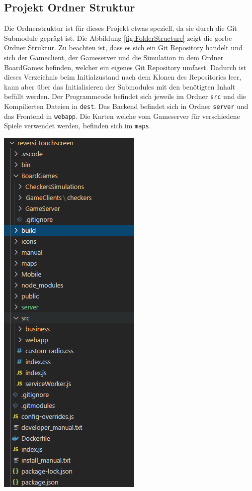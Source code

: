 \documentclass[12pt,a4paper,bibliography=totocnumbered,listof=totocnumbered]{article}
\begin{document}
\begin{appendix}
\section{Projekt Ordner Struktur}
Die Ordnerstruktur ist für dieses Projekt etwas speziell, da sie durch die Git Submodule geprägt ist.
Die Abbildung \ref{fig:FolderStructure} zeigt die gorbe Ordner Struktur. Zu beachten ist, dass es sich ein Git Repository handelt und sich
der Gameclient, der Gameserver und die Simulation in dem Ordner BoardGames befinden, welcher ein eigenes Git Repository umfasst. 
Dadurch ist dieses Verzeichnis beim Initialzustand nach dem Klonen des Repositories leer, kann aber über das Initialisieren der Submodules 
mit den benötigten Inhalt befüllt werden. Der Programmcode befindet sich jeweils im Ordner \texttt{src} und die Kompilierten Dateien 
in \texttt{dest}. Das Backend befindet sich in Ordner \texttt{server} und das Frontend in \texttt{webapp}. Die Karten welche vom Gameserver 
für verschiedene Spiele verwendet werden, befinden sich im \texttt{maps}.

\vspace{1em}
\begin{minipage}{\linewidth}
	\centering
	\includegraphics[width=0.4\linewidth]{pics/FolderStructure.png}
    \label{fig:FolderStructure}
\end{minipage}


\end{appendix}
\end{document}
